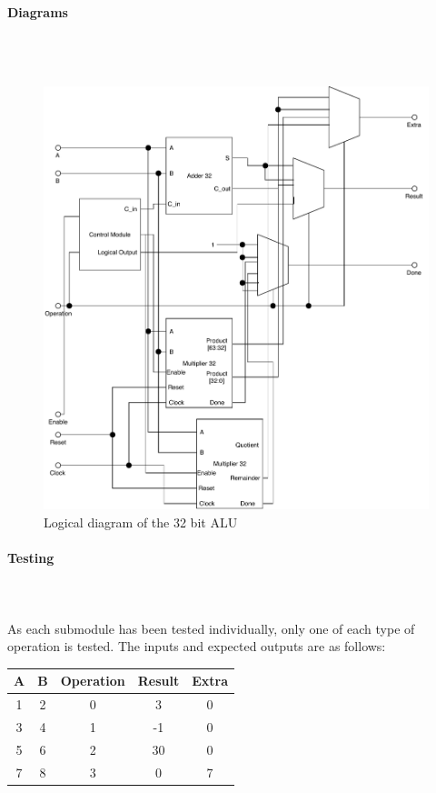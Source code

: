 \documentclass{article}
\begin{document}
    \paragraph{Diagrams}
    \hfill\\\\
    \begin{figure}[H]
        \centering
        \includegraphics{../diagrams/alu/alu_32.pdf}
        \caption{Logical diagram of the 32 bit ALU}
    \end{figure}

    \paragraph{Testing}
    \hfill\\\\
    As each submodule has been tested individually, only one of each type
    of operation is tested. The inputs and expected outputs are as follows:

    \begin{center}
        \begin{tabular}{|c|c|c||c|c|}
            \hline
            A & B & Operation & Result & Extra
            \\\hline\hline
            1 & 2 & 0 & 3 & 0
            \\\hline
            3 & 4 & 1 & -1 & 0
            \\\hline
            5 & 6 & 2 & 30 & 0
            \\\hline
            7 & 8 & 3 & 0 & 7
            \\\hline
        \end{tabular}
    \end{center}
\end{document}
